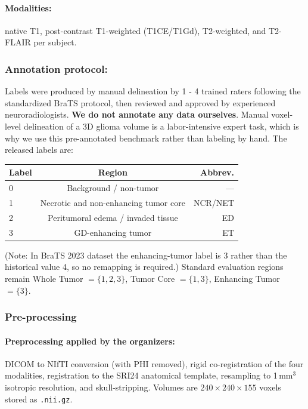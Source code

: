     \paragraph{Modalities:}native T1, post-contrast T1-weighted (T1CE/T1Gd), T2-weighted, and T2-FLAIR per subject.

    \subsubsection{Annotation protocol:}
    
    Labels were produced by manual delineation by 1 - 4 trained raters following the standardized BraTS protocol, then reviewed and approved by experienced neuroradiologists. \textbf{We do not annotate any data ourselves}. Manual voxel-level delineation of a 3D glioma volume is a labor-intensive expert task, which is why we use this pre-annotated benchmark rather than labeling by hand. The released labels are:

    \begin{center}
    \begin{tabular}{|l|c|r|}
    \hline
    \textbf{Label} & \textbf{Region} & \textbf{Abbrev.} \\
      \hline
    0 & Background / non-tumor & --- \\
    \hline
    1 & Necrotic and non-enhancing tumor core & NCR/NET \\
    \hline
    2 & Peritumoral edema / invaded tissue & ED \\
    \hline
    3 & GD-enhancing tumor & ET \\
    \hline
    \end{tabular}
\end{center}
(Note: In BraTS 2023 dataset the enhancing-tumor label is 3 rather than the historical value 4, so no remapping is required.) Standard evaluation regions remain Whole Tumor $=\{1,2,3\}$, Tumor Core $=\{1,3\}$, Enhancing Tumor $=\{3\}$.

\subsubsection{Pre-processing}
\paragraph{Preprocessing applied by the organizers:} DICOM to NIfTI conversion (with PHI removed), rigid co-registration of the four modalities, registration to the SRI24 anatomical template, resampling to 1\,mm$^3$ isotropic resolution, and skull-stripping. Volumes are $240\times240\times155$ voxels stored as \texttt{.nii.gz}.

